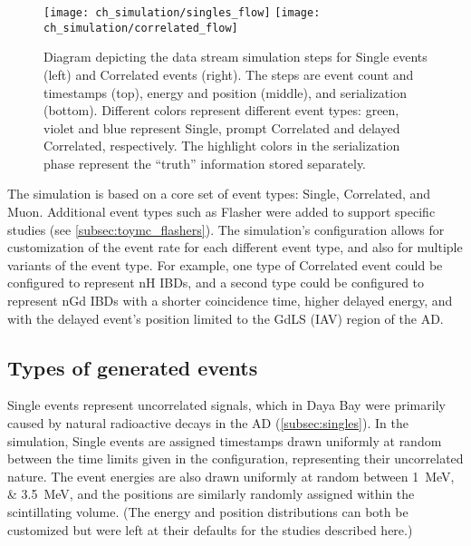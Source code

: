 \begin{figure}
    \texttt{[image: ch\_simulation/singles\_flow]}
    \texttt{[image: ch\_simulation/correlated\_flow]}
    \caption{
        Diagram depicting the data stream simulation steps
        for Single events (left) and Correlated events (right).
        The steps are event count and timestamps (top),
        energy and position (middle), and serialization (bottom).
        Different colors represent different event types:
        green, violet and blue represent Single,
        prompt Correlated and delayed Correlated,
        respectively.
        The highlight colors in the serialization phase
        represent the ``truth'' information stored separately.
    }
    \label{fig:my_toymc_flowchart}
\end{figure}


The simulation is based on a core set of event types:
Single, Correlated, and Muon.
Additional event types such as Flasher were added to support specific studies
(see \cref{subsec:toymc_flashers}).
The simulation's configuration allows for customization of the event rate
for each different event type,
and also for multiple variants of the event type.
For example, one type of Correlated event could be configured to represent nH IBDs,
and a second type could be configured to represent nGd IBDs
with a shorter coincidence time, higher delayed energy,
and with the delayed event's position limited to the GdLS (IAV) region of the AD.

\subsection{Types of generated events}

Single events represent uncorrelated signals,
which in Daya Bay were primarily caused by natural radioactive decays in the AD
(\cref{subsec:singles}).
In the simulation, Single events are assigned timestamps
drawn uniformly at random between the time limits given in the configuration,
representing their uncorrelated nature.
The event energies are also drawn uniformly at random
between \SIlist{1;3.5}{\MeV},
and the positions are similarly randomly assigned
within the scintillating volume.
(The energy and position distributions can both be customized
but were left at their defaults for the studies described here.)

